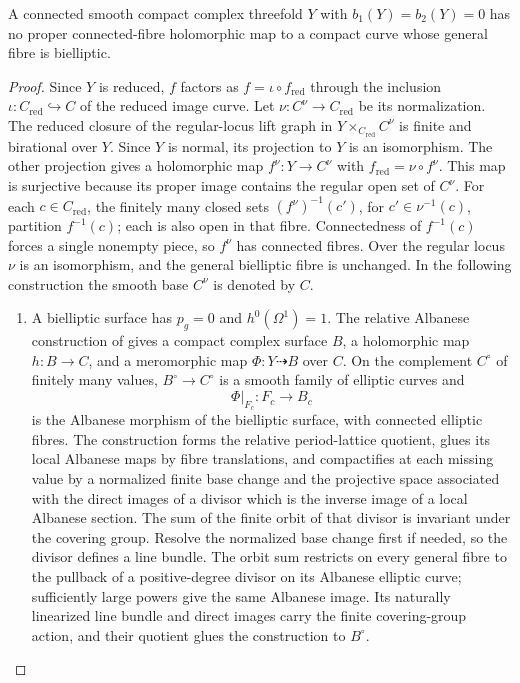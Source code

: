 \begin{proposition}\hypertarget{tag-01FD}{}\label{cdp:st:C.3.7}


A connected smooth compact complex threefold $Y$ with $b_1(Y)=b_2(Y)=0$ has no
proper connected-fibre holomorphic map to a compact curve whose
general fibre is bielliptic.
\end{proposition}


\begin{proof}

Since $Y$ is reduced, $f$ factors as $f=\iota\circ f_{\mathrm{red}}$
through the inclusion $\iota:C_{\mathrm{red}}\hookrightarrow C$ of the
reduced image curve. Let $\nu:C^\nu\to C_{\mathrm{red}}$ be its
normalization. The reduced closure of the regular-locus lift graph in
$Y\times_{C_{\mathrm{red}}}C^\nu$ is finite and birational over $Y$.
Since $Y$ is normal, its projection to $Y$ is an isomorphism. The other
projection gives a holomorphic map $f^\nu:Y\to C^\nu$ with
$f_{\mathrm{red}}=\nu\circ f^\nu$. This map is surjective because its
proper image contains the regular open set of $C^\nu$. For each
$c\in C_{\mathrm{red}}$, the finitely many closed sets
$(f^\nu)^{-1}(c')$, for $c'\in\nu^{-1}(c)$, partition $f^{-1}(c)$;
each is also open in that fibre. Connectedness of $f^{-1}(c)$ forces
a single nonempty piece, so $f^\nu$ has connected fibres. Over the
regular locus $\nu$ is an isomorphism, and the general bielliptic fibre
is unchanged. In the following construction the smooth base $C^\nu$
is denoted by $C$.

\begin{enumerate}[label=\arabic*.,leftmargin=*]
\item A bielliptic surface has
$p_g=0$ and $h^0(\Omega^1)=1$. The relative Albanese construction of
\cite[Proposition~2, pp.~605--608]{Kawai1969} gives a compact complex surface
$B$, a holomorphic map $h:B\to C$, and a meromorphic map
$\Phi:Y\dashrightarrow B$ over $C$. On the complement $C^\circ$
of finitely many values, $B^\circ\to C^\circ$ is a smooth family
of elliptic curves and
\[
 \Phi|_{F_c}:F_c\longrightarrow B_c
\]
is the Albanese morphism of the bielliptic surface, with connected
elliptic fibres. The
construction forms the relative period-lattice quotient, glues its
local Albanese maps by fibre translations, and compactifies at each
missing value by a normalized finite base change and the projective
space associated with the direct images of a divisor which is the
inverse image of a local Albanese section. The sum of the finite orbit of that divisor is invariant under
the covering group. Resolve the normalized base change first if needed, so the
divisor defines a line bundle. The orbit sum restricts on every
general fibre to the pullback of a positive-degree divisor on its
Albanese elliptic curve; sufficiently large powers give the same
Albanese image. Its naturally linearized line bundle and direct
images carry the finite covering-group action, and their quotient
glues the construction to $B^\circ$.


\end{enumerate}
\end{proof}
